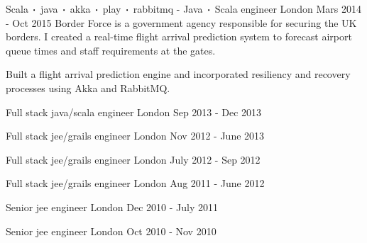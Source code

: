 \begin{cventries}
    \cventry
    {Scala$\sqbig$java$\sqbig$akka$\sqbig$play$\sqbig$rabbitmq}
    { - Java$\sqbig$Scala engineer}
    {London}
    {Mars 2014 - Oct 2015}
    {Border Force is a government agency responsible for securing the UK borders. I created a real-time flight arrival prediction system to forecast airport queue times and staff requirements at the gates.}
    {
        \begin{cvitems}
            \item{Built a flight arrival prediction engine and incorporated resiliency and recovery processes using Akka and RabbitMQ.}
        \end{cvitems}
    }

    \cventry
    {Full stack java/scala engineer}
    {}
    {London}
    {Sep 2013 - Dec 2013}
    {}
    {}

    \cventry
    {Full stack jee/grails engineer}
    {}
    {London}
    {Nov 2012 - June 2013}
    {}
    {}

    \cventry
    {Full stack jee/grails engineer}
    {}
    {London}
    {July 2012 - Sep 2012}
    {}
    {}

    \cventry
    {Full stack jee/grails engineer}
    {}
    {London}
    {Aug 2011 - June 2012}
    {}
    {}

    \cventry
    {Senior jee engineer}
    {}
    {London}
    {Dec 2010 - July 2011}
    {}
    {}

    \cventry
    {Senior jee engineer}
    {}
    {London}
    {Oct 2010 - Nov 2010}
    {}
    {}
\end{cventries}


